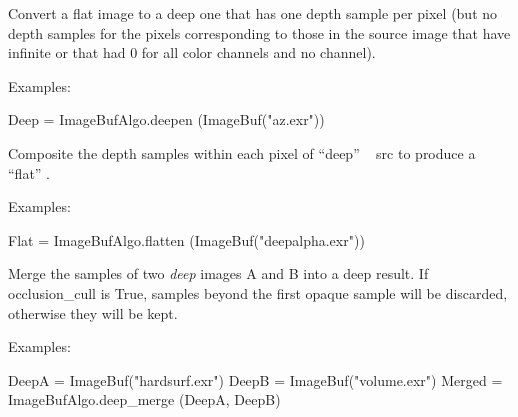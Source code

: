   

Convert a flat image to a deep one that has one depth sample per pixel
(but no depth samples for the pixels corresponding to those in the source
image that have infinite  or that had 0 for all color channels and no
 channel).

\smallskip
\noindent Examples:
\begin{code}
    Deep = ImageBufAlgo.deepen (ImageBuf("az.exr"))
\end{code}
\apiend


  

Composite the depth samples within each pixel of ``deep'' \ImageBuf\ {\cf
src} to produce a ``flat'' \ImageBuf.

\smallskip
\noindent Examples:
\begin{code}
    Flat = ImageBufAlgo.flatten (ImageBuf("deepalpha.exr"))
\end{code}
\apiend

  

Merge the samples of two \emph{deep} images {\cf A} and {\cf B} into a deep
result. If {\cf occlusion_cull} is {\cf True}, samples beyond
the first opaque sample will be discarded, otherwise they will be kept.

\smallskip
\noindent Examples:
\begin{code}
    DeepA = ImageBuf("hardsurf.exr")
    DeepB = ImageBuf("volume.exr")
    Merged = ImageBufAlgo.deep_merge (DeepA, DeepB)
\end{code}
\apiend

  

